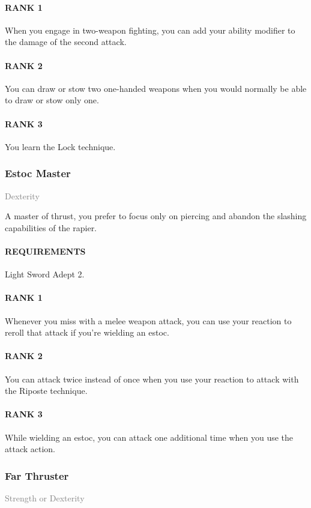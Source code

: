\paragraph{RANK 1} When you engage in two-weapon fighting, you can add your ability modifier to the damage of the second attack.
\paragraph{RANK 2} You can draw or stow two one-handed weapons when you would normally be able to draw or stow only one.
\paragraph{RANK 3} You learn the Lock technique.

\subsubsection{Estoc Master} \label{feat::estocmaster}
\small{\textcolor{gray}{Dexterity}}

\normalsize
A master of thrust, you prefer to focus only on piercing and abandon the slashing capabilities of the rapier.
\paragraph{REQUIREMENTS} Light Sword Adept 2.
\paragraph{RANK 1} Whenever you miss with a melee weapon attack, you can use your reaction to reroll that attack if you're wielding an estoc.
\paragraph{RANK 2} You can attack twice instead of once when you use your reaction to attack with the Riposte technique.
\paragraph{RANK 3} While wielding an estoc, you can attack one additional time when you use the attack action.

\subsubsection{Far Thruster} \label{feat::farthruster}
\small{\textcolor{gray}{Strength or Dexterity}}

